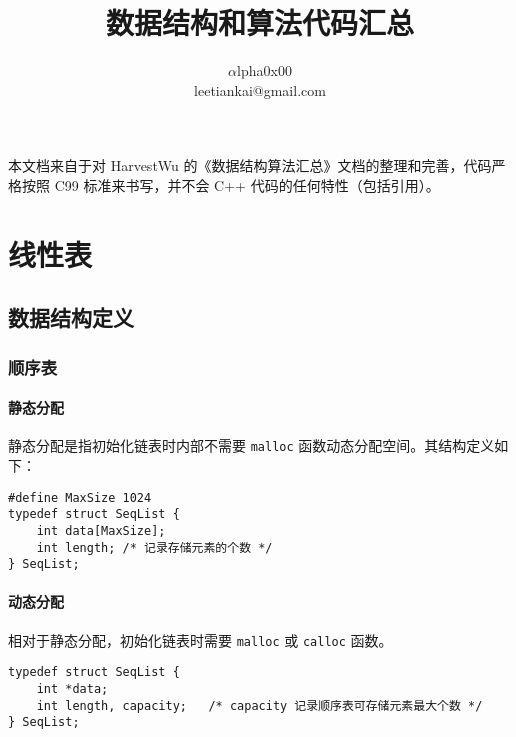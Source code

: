 \documentclass{ctexart}
\title{数据结构和算法代码汇总}
\author{$\alpha$lpha0x00\\leetiankai@gmail.com}
\begin{document}
\maketitle

本文档来自于对 HarvestWu 的《数据结构算法汇总》文档的整理和完善，代码严格按照 C99 标准来书写，并不会 C++ 代码的任何特性（包括引用）。
\newpage

\tableofcontents
\newpage

\section{线性表}

\subsection{数据结构定义}
\subsubsection{顺序表}
\paragraph{静态分配} 静态分配是指初始化链表时内部不需要 \texttt{malloc} 函数动态分配空间。其结构定义如下：
\begin{verbatim}
#define MaxSize 1024
typedef struct SeqList {
    int data[MaxSize];
    int length; /* 记录存储元素的个数 */
} SeqList;
\end{verbatim}

\paragraph{动态分配} 相对于静态分配，初始化链表时需要 \texttt{malloc} 或 \texttt{calloc} 函数。
\begin{verbatim}
typedef struct SeqList {
    int *data;
    int length, capacity;   /* capacity 记录顺序表可存储元素最大个数 */
} SeqList;
\end{verbatim}
\end{document}
